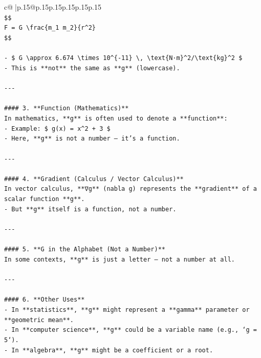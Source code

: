 \documentclass{article}
\begin{document}
{\begin{supertabular}{c@{$\;$}|p{.15\linewidth}@{}p{.15\linewidth}p{.15\linewidth}p{.15\linewidth}p{.15\linewidth}p{.15\linewidth}}
{{{\\ 
\texttt{\$\$} \\
\texttt{F = G \textbackslash{}frac\{m\_1 m\_2\}\{r\^{}2\}} \\
\texttt{\$\$} \\
\\ 
\texttt{{-} \$ G \textbackslash{}approx 6.674 \textbackslash{}times 10\^{}\{{-}11\} \textbackslash{}, \textbackslash{}text\{N·m\}\^{}2/\textbackslash{}text\{kg\}\^{}2 \$} \\
\texttt{{-} This is **not** the same as **g** (lowercase).} \\
\\ 
\texttt{{-}{-}{-}} \\
\\ 
\texttt{\#\#\#\# 3. **Function (Mathematics)**} \\
\texttt{In mathematics, **g** is often used to denote a **function**:} \\
\texttt{{-} Example: \$ g(x) = x\^{}2 + 3 \$} \\
\texttt{{-} Here, **g** is not a number — it's a function.} \\
\\ 
\texttt{{-}{-}{-}} \\
\\ 
\texttt{\#\#\#\# 4. **Gradient (Calculus / Vector Calculus)**} \\
\texttt{In vector calculus, **∇g** (nabla g) represents the **gradient** of a scalar function **g**.} \\
\texttt{{-} But **g** itself is a function, not a number.} \\
\\ 
\texttt{{-}{-}{-}} \\
\\ 
\texttt{\#\#\#\# 5. **G in the Alphabet (Not a Number)**} \\
\texttt{In some contexts, **g** is just a letter — not a number at all.} \\
\\ 
\texttt{{-}{-}{-}} \\
\\ 
\texttt{\#\#\#\# 6. **Other Uses**} \\
\texttt{{-} In **statistics**, **g** might represent a **gamma** parameter or **geometric mean**.} \\
\texttt{{-} In **computer science**, **g** could be a variable name (e.g., `g = 5`).} \\
\texttt{{-} In **algebra**, **g** might be a coefficient or a root.} \\
}}}
\end{supertabular}}
\end{document}
